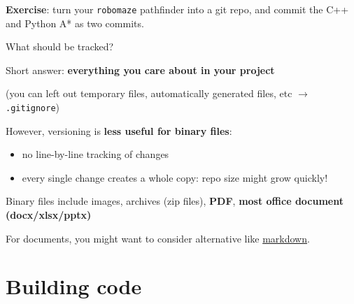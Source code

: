 \documentclass[compress]{beamer}
\begin{document}
\begin{frame}[plain]{}
    \begin{center}
        \Large
        {\bf Exercise}: turn your {\tt robomaze} pathfinder into a git repo, and commit the C++ and Python A* as two commits.
    \end{center}

\end{frame}

\begin{frame}{What should be tracked?}

    Short answer: \textbf{everything you care about in your project}
    \pause

    (you can left out temporary files, automatically generated files, etc
    $\rightarrow$ \texttt{.gitignore})

    \pause

    However, versioning is \textbf{less useful for binary files}: 

    \begin{itemize}
        \item no line-by-line tracking of changes
        \item every single change creates a whole copy: repo size might grow
            quickly!
    \end{itemize}

    Binary files include images, archives (zip files), \textbf{PDF},
    \textbf{most office document (docx/xlsx/pptx)}
    \pause

    For documents, you might want to consider alternative like
    \href{https://en.wikipedia.org/wiki/Markdown\#Example}{markdown}.

\end{frame}


\section[Compilation]{Building code}
\end{document}
